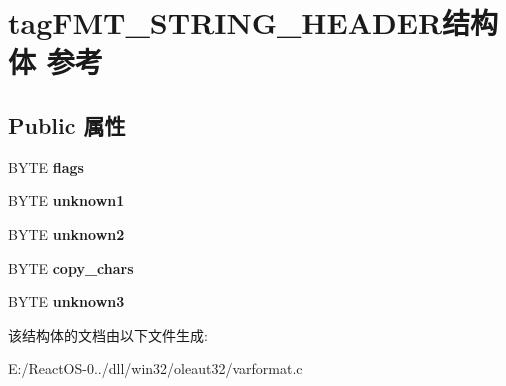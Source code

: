 \hypertarget{structtag_f_m_t___s_t_r_i_n_g___h_e_a_d_e_r}{}\section{tag\+F\+M\+T\+\_\+\+S\+T\+R\+I\+N\+G\+\_\+\+H\+E\+A\+D\+E\+R结构体 参考}
\label{structtag_f_m_t___s_t_r_i_n_g___h_e_a_d_e_r}
\subsection*{Public 属性}
\begin{DoxyCompactItemize}
\item 
\mbox{\label{structtag_f_m_t___s_t_r_i_n_g___h_e_a_d_e_r_a1bada70545048c26a24a2b8177045d9b}} 
B\+Y\+TE {\bfseries flags}
\item 
\mbox{\label{structtag_f_m_t___s_t_r_i_n_g___h_e_a_d_e_r_a88f6f92ae8fb89678fe63054d757d1f9}} 
B\+Y\+TE {\bfseries unknown1}
\item 
\mbox{\label{structtag_f_m_t___s_t_r_i_n_g___h_e_a_d_e_r_ab5aed92d0cdd1a6f124a17288802f461}} 
B\+Y\+TE {\bfseries unknown2}
\item 
\mbox{\label{structtag_f_m_t___s_t_r_i_n_g___h_e_a_d_e_r_a6ae3079c2b5b2cb5002b7b9b417c7a6c}} 
B\+Y\+TE {\bfseries copy\+\_\+chars}
\item 
\mbox{\label{structtag_f_m_t___s_t_r_i_n_g___h_e_a_d_e_r_ac55f0d2cbbcf228017674f83b8455629}} 
B\+Y\+TE {\bfseries unknown3}
\end{DoxyCompactItemize}


该结构体的文档由以下文件生成\+:\begin{DoxyCompactItemize}
\item 
E\+:/\+React\+O\+S-\/0../dll/win32/oleaut32/varformat.\+c\end{DoxyCompactItemize}
